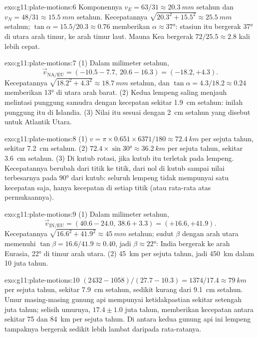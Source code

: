 \begin{solution}{exo:g11:plate-motions:6}
Komponennya $v_E = 63/31 \approx \qty{20.3}{mm}$ setahun dan $v_N = 48/31 \approx
\qty{15.5}{mm}$ setahun. Kecepatannya $\sqrt{20.3^2 + 15.5^2} \approx
\qty{25.5}{mm}$ setahun; $\tan\alpha = 15.5/20.3 \approx 0.76$ memberikan $\alpha
\approx \ang{37}$: stasiun itu bergerak \ang{37} di utara arah timur, ke arah
timur laut. Mauna Kea bergerak $72/25.5 \approx 2.8$ kali lebih cepat.
\end{solution}

\begin{solution}{exo:g11:plate-motions:7}
(1) Dalam milimeter setahun,
\[
  \vec v_{\mathrm{NA/EU}} = (-10.5 - 7.7,\ 20.6 - 16.3) = (-18.2, +4.3).
\] Kecepatannya $\sqrt{18.2^2 + 4.3^2} \approx
\qty{18.7}{mm}$ setahun, dan $\tan\alpha = 4.3/18.2 \approx 0.24$ memberikan
\ang{13} di utara arah barat. (2) Kedua lempeng saling menjauh melintasi
punggung samudra dengan kecepatan sekitar \qty{1.9}{cm} setahun: inilah  punggung itu di Islandia. (3) Nilai itu sesuai dengan
\qty{2}{cm} setahun yang disebut untuk Atlantik Utara.
\end{solution}

\begin{solution}{exo:g11:plate-motions:8}
(1) $v = \pi \times 0.651 \times 6371/180 \approx \qty{72.4}{km}$ per sejuta
tahun, sekitar \qty{7.2}{cm} setahun. (2) $72.4 \times \sin\ang{30} \approx
\qty{36.2}{km}$ per sejuta tahun, sekitar \qty{3.6}{cm} setahun. (3) Di kutub
rotasi, jika kutub itu terletak pada lempeng. Kecepatannya berubah dari titik ke
titik, dari nol di kutub sampai nilai terbesarnya pada \ang{90} dari kutub:
seluruh lempeng tidak mempunyai satu kecepatan saja, hanya kecepatan di setiap
titik (atau rata-rata atas permukaannya).
\end{solution}

\begin{solution}{exo:g11:plate-motions:9}
(1) Dalam milimeter setahun,
\[
  \vec v_{\mathrm{IN/EU}} = (40.6 - 24.0,\ 38.6 + 3.3) = (+16.6, +41.9).
\] Kecepatannya $\sqrt{16.6^2 + 41.9^2} \approx
\qty{45}{mm}$ setahun; sudut $\beta$ dengan arah utara memenuhi $\tan\beta =
16.6/41.9 \approx 0.40$, jadi $\beta \approx \ang{22}$: India bergerak ke arah
Eurasia, \ang{22} di timur arah utara. (2) \qty{45}{km} per sejuta tahun, jadi
\qty{450}{km} dalam 10 juta tahun.
\end{solution}

\begin{solution}{exo:g11:plate-motions:10}
$(2432 - 1058)/(27.7 - 10.3) = 1374/17.4 \approx \qty{79}{km}$ per sejuta
tahun, sekitar \qty{7.9}{cm} setahun, sedikit kurang dari \qty{9.1}{cm} setahun.
Umur masing-masing gunung api mempunyai ketidakpastian sekitar setengah juta
tahun; selisih umurnya, $17.4 \pm 1.0$ juta tahun, memberikan kecepatan antara
sekitar 75 dan \qty{84}{km} per sejuta tahun. Di antara kedua gunung api ini
lempeng tampaknya bergerak sedikit lebih lambat daripada rata-ratanya.
\end{solution}

